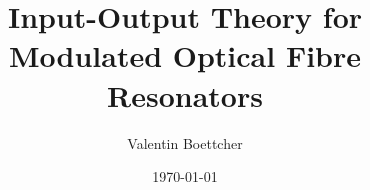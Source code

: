 \documentclass[fontsize=12pt,paper=usletter,open=any,
  twoside=no,toc=listof,toc=bibliography,
  captions=nooneline,captions=tableabove,english,DIV=calc,numbers=noenddot,final,parskip=full,
  headinclude=true,footinclude=false,BCOR=0mm,heading=normal]{scrartcl}
\author{Valentin Boettcher}
\title{Input-Output Theory for Modulated Optical Fibre Resonators}
\date{\today}
\begin{document}
\maketitle
\tableofcontents

\cleardoubleemptypage





\appendix


\printbibliography
\printindex
\end{document}

